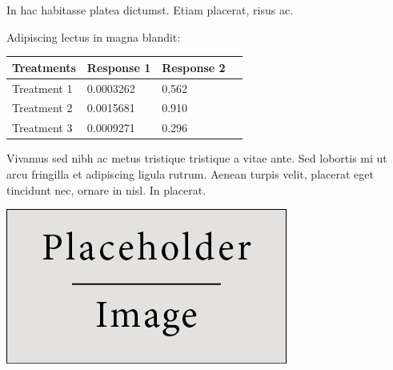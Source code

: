 \documentclass[a0,portrait]{a0poster}
\begin{document}
\begin{multicols}{2}
In hac habitasse platea dictumst. Etiam placerat, risus ac.

Adipiscing lectus in magna blandit:

\begin{center}\vspace{1cm}
\begin{tabular}{l l l l}
\toprule
\textbf{Treatments} & \textbf{Response 1} & \textbf{Response 2} \\
\midrule
Treatment 1 & 0.0003262 & 0.562 \\
Treatment 2 & 0.0015681 & 0.910 \\
Treatment 3 & 0.0009271 & 0.296 \\
\bottomrule
\end{tabular}
\end{center}\vspace{1cm}

Vivamus sed nibh ac metus tristique tristique a vitae ante. Sed lobortis mi ut arcu fringilla et adipiscing ligula rutrum. Aenean turpis velit, placerat eget tincidunt nec, ornare in nisl. In placerat.

\begin{center}\vspace{1cm}
\includegraphics[width=0.8\linewidth]{placeholder}
\end{center}\vspace{1cm}





\end{multicols}
\end{document}
